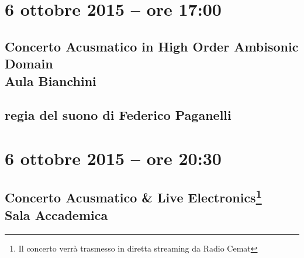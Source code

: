 \documentclass[8pt, twoside, a5paper]{extreport}
\begin{document}
\bigskip

\begin{multicols}{2}




\end{multicols}

\clearpage


\section*{6 ottobre 2015 -- ore 17:00}

\subsection*{{\small Concerto Acusmatico in High Order Ambisonic Domain} \\
	\textsf{Aula Bianchini}}

{\fontsize{30}{30} }

\subsection*{\textsf{regia del suono di Federico Paganelli}}

\bigskip

\begin{multicols}{2}




\end{multicols}

\clearpage

\section*{6 ottobre 2015 -- ore 20:30}

\subsection*{{\small Concerto Acusmatico \& Live Electronics\footnote{ Il concerto verrà trasmesso in diretta streaming da Radio Cemat}} \\
	\textsf{Sala Accademica}}

{\fontsize{30}{30} }
\end{document}
